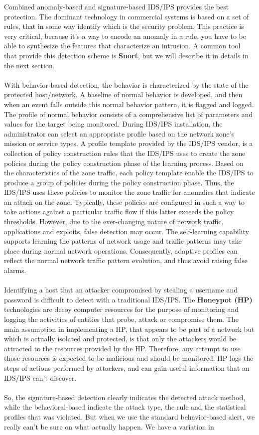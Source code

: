 \documentclass[11pt]{article}
\begin{document}
Combined anomaly-based and signature-based IDS/IPS provides the best protection. The dominant technology in commercial systems is based on a set of rules, that in some way identify which is the security problem. This practice is very critical, because it's a way to encode an anomaly in a rule, you have to be able to synthesize the features that characterize an intrusion. A common tool that provide this detection scheme is \textbf{Snort}, but we will describe it in details in the next section. \\\\With behavior-based detection, the behavior is characterized by the state of the protected host/network. A baseline of normal behavior is developed, and then when an event falls outside this normal behavior pattern, it is flagged and logged. The profile of normal behavior consists of a comprehensive list of parameters and values for the target being monitored. During IDS/IPS installation, the administrator can select an appropriate profile based on the network zone's mission or service types. A profile template provided by the IDS/IPS vendor, is a collection of policy construction rules that the IDS/IPS uses to create the zone policies during the policy construction phase of the learning process. Based on the characteristics of the zone traffic, each policy template enable the IDS/IPS to produce a group of policies during the policy construction phase. Thus, the IDS/IPS uses these policies to monitor the zone traffic for anomalies that indicate an attack on the zone. Typically, these policies are configured in such a way to take actions against a particular traffic flow if this latter exceeds the policy thresholds. However, due to the ever-changing nature of network traffic, applications and exploits, false detection may occur. The self-learning capability supports learning the patterns of network usage and traffic patterns may take place during normal network operations. Consequently, adaptive profiles can reflect the normal network traffic pattern evolution, and thus avoid raising false alarms.\\\\Identifying a host that an attacker compromised by stealing a username and password is difficult to detect with a traditional IDS/IPS. The \textbf{Honeypot (HP)} technologies are decoy computer resources for the purpose of monitoring and logging the activities of entities that probe, attack or compromise them. The main assumption in implementing a HP, that appears to be part of a network but which is actually isolated and protected, is that only the attackers would be attracted to the resources provided by the HP. Therefore, any attempt to use those resources is expected to be malicious and should be monitored. HP logs the steps of actions performed by attackers, and can gain useful information that an IDS/IPS can't discover.\\\\So, the signature-based detection clearly indicates the detected attack method, while the behavioral-based indicate the attack type, the rule and the statistical profiles that was violated. But when we use the standard behavior-based alert, we really can't be sure on what actually happen. We have a variation in 
\end{document}
